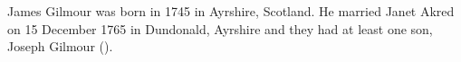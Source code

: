 
James Gilmour was born in 1745 in Ayrshire, Scotland.
He married Janet Akred on 15 December 1765 in Dundonald, Ayrshire and they had at least one son, Joseph Gilmour ().


